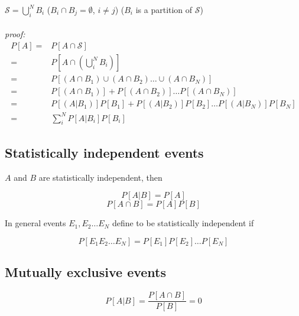 $\mathcal{S}=\bigcup^{N}_{i}B_{i}$ ($B_{i}\cap B_{j}=\emptyset$, $i\neq j$) ($B_{i}$ is a partition of $\mathcal{S}$)\\\\
\emph{proof:}
\begin{equation*}
	\begin{split}
		P[A]
			=&
				P[A\cap \mathcal{S}]\\
			=&
				P\left[A\cap \left(\bigcup^{N}_{i}B_{i}\right)\right]\\
			=&
				P\left[\left(A\cap B_{1}\right)\cup\left(A\cap B_{2}\right)\dots\cup\left(A\cap B_{N}\right)\right]\\
			=&
				P\left[\left(A\cap B_{1}\right)\right]+P\left[\left(A\cap B_{2}\right)\right]\dots P\left[\left(A\cap B_{N}\right)\right]\\
			=&
				P\left[\left(A| B_{1}\right)\right]P\left[B_{1}\right]+P\left[\left(A|B_{2}\right)\right]P\left[B_{2}\right]\dots P\left[\left(A| B_{N}\right)\right]P\left[B_{N}\right]\\
			=&
				\sum^{N}_{i}P\left[A|B_{i}\right]P\left[B_{i}\right]
	\end{split}
\end{equation*}

\subsection{Statistically independent events}

$A$ and $B$ are statistically independent, then 

\begin{equation*}
	P[A|B]=P[A]
\end{equation*}
\begin{equation*}
	P[A\cap B]=P[A]P[B]
\end{equation*}

In general events $E_{1},E_{2}\dots E_{N}$ define to be statistically independent if

\begin{equation*}
	P[E_{1}E_{2}\dots E_{N}]=P[E_{1}]P[E_{2}]\dots P[E_{N}]
\end{equation*}


\subsection{Mutually exclusive events}
\begin{equation*}
	P[A|B]=\frac{P[A\cap B]}{P[B]}=0
\end{equation*}


